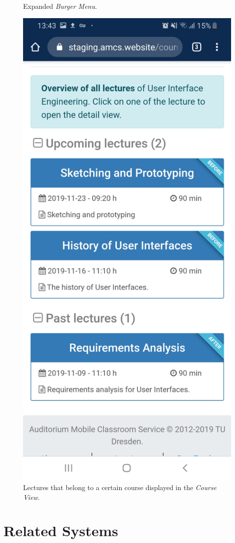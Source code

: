 \begin{figure}
\begin{minipage}[t]{.5\textwidth}
		\captionsetup{width=.8\linewidth}
		\caption{Expanded \emph{Burger Menu}.}
		\label{fig:menu}
	\end{minipage}%
	\begin{minipage}[t]{.5\textwidth}
		\centering
		\includegraphics[width=0.95\linewidth]{screenshots/course_view_3.jpg}
		\captionsetup{width=.8\linewidth}
		\caption{Lectures that belong to a certain course displayed in the \emph{Course View}.}
		\label{fig:other}
	\end{minipage}
\end{figure}

\section{Related Systems}
\label{section:soa:related}

